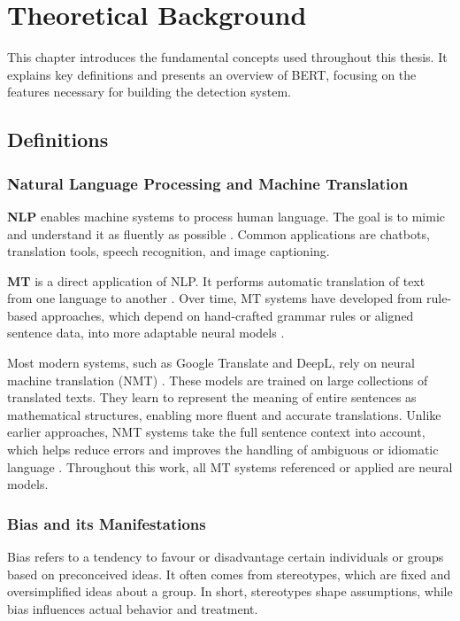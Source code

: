 \chapter{Theoretical Background}
This chapter introduces the fundamental concepts used throughout this thesis. It explains key definitions and presents an overview of BERT, focusing on the features necessary for building the detection system.


\section{Definitions}
\subsection{Natural Language Processing and Machine Translation}
    \textbf{NLP} enables machine systems to process human language. The goal is to mimic and understand it as fluently as possible \parencite{smacchiaDoesAIReflect2024,ullmannGenderBiasMachine2022}. Common applications are chatbots, translation tools, speech recognition, and image captioning.

    \textbf{MT} is a direct application of NLP. It performs automatic translation of text from one language to another \parencite{linMachineTranslationAcademic2009}. Over time, MT systems have developed from rule-based approaches, which depend on hand-crafted grammar rules or aligned sentence data, into more adaptable neural models \parencite{chakravarthiSurveyOrthographicInformation2021}.

    Most modern systems, such as Google Translate and DeepL, rely on neural machine translation (NMT) \parencite{wuGooglesNeuralMachine2016,deeplHowDoesDeepL2021}. These models are trained on large collections of translated texts. They learn to represent the meaning of entire sentences as mathematical structures, enabling more fluent and accurate translations. Unlike earlier approaches, NMT systems take the full sentence context into account, which helps reduce errors and improves the handling of ambiguous or idiomatic language \parencite{wuGooglesNeuralMachine2016}. Throughout this work, all MT systems referenced or applied are neural models.

\subsection{Bias and its Manifestations}
\label{subsection:manifestations_of_gb}
    Bias refers to a tendency to favour or disadvantage certain individuals or groups based on preconceived ideas. It often comes from stereotypes, which are fixed and oversimplified ideas about a group. In short, stereotypes shape assumptions, while bias influences actual behavior and treatment.

